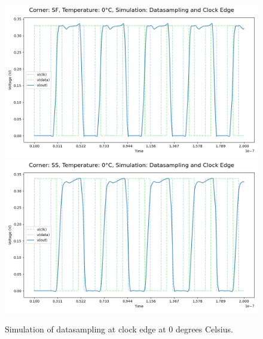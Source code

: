 \begin{figure}[H]
    \vspace{5pt}
    \includegraphics[height= 0.21\textheight]{figures/aimspice/SF/0/W1.csv.png}
    \vspace{5pt}
    \includegraphics[height= 0.21\textheight]{figures/aimspice/SS/0/W1.csv.png}
    \caption{Simulation of datasampling at clock edge at 0 degrees Celsius.}
    \label{fig:aimspice_W1_0}
\end{figure}

\pagebreak

